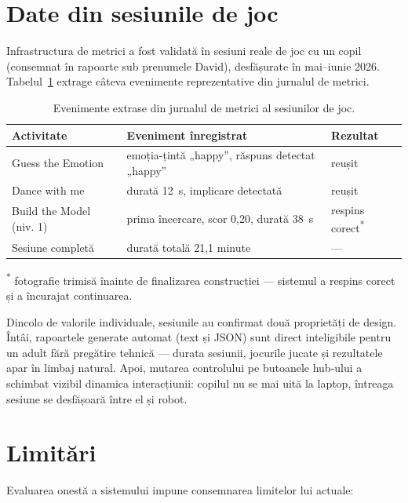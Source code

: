 \section{Date din sesiunile de joc}

Infrastructura de metrici a fost validată în sesiuni reale de joc cu un copil (consemnat în rapoarte sub prenumele David), desfășurate în mai--iunie 2026. Tabelul~\ref{tab:sesiuni} extrage câteva evenimente reprezentative din jurnalul de metrici.

\begin{table}[htb]
    \centering
    \caption{Evenimente extrase din jurnalul de metrici al sesiunilor de joc.}
    \label{tab:sesiuni}
    \begin{tabular}{|l|>{\raggedright\arraybackslash}p{6cm}|l|}
        \hline
        \textbf{Activitate} & \textbf{Eveniment înregistrat} & \textbf{Rezultat} \\
        \hline
        Guess the Emotion & emoția-țintă „happy”, răspuns detectat „happy” & reușit \\
        Dance with me & durată 12~s, implicare detectată & reușit \\
        Build the Model (niv. 1) & prima încercare, scor 0,20, durată 38~s & respins corect\textsuperscript{*} \\
        Sesiune completă & durată totală 21,1 minute & — \\
        \hline
    \end{tabular}

    \raggedright\footnotesize\textsuperscript{*} fotografie trimisă înainte de finalizarea construcției — sistemul a respins corect și a încurajat continuarea.
\end{table}

Dincolo de valorile individuale, sesiunile au confirmat două proprietăți de design. Întâi, rapoartele generate automat (text și JSON) sunt direct inteligibile pentru un adult fără pregătire tehnică — durata sesiunii, jocurile jucate și rezultatele apar în limbaj natural. Apoi, mutarea controlului pe butoanele hub-ului a schimbat vizibil dinamica interacțiunii: copilul nu se mai uită la laptop, întreaga sesiune se desfășoară între el și robot.

\section{Limitări}

Evaluarea onestă a sistemului impune consemnarea limitelor lui actuale:

